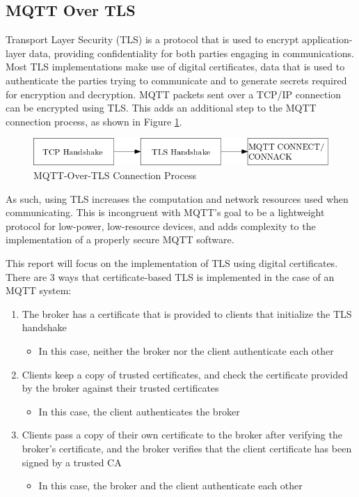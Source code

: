 \documentclass[12pt]{article}
\begin{document}
\subsection{MQTT Over TLS}
Transport Layer Security (TLS) is a protocol that is used to encrypt application-layer data, providing confidentiality for both parties engaging in communications. Most TLS implementations make use of digital certificates, data that is used to authenticate the parties trying to communicate and to generate secrets required for encryption and decryption. MQTT packets sent over a TCP/IP connection can be encrypted using TLS. This adds an additional step to the MQTT connection process, as shown in Figure \ref{fig:connection}.\par
\begin{figure}[!htb]
\centering
	\includegraphics[scale=0.5]{tcp-tls-mqtt.png}
	\caption{MQTT-Over-TLS Connection Process\label{fig:connection}}
\end{figure}
As such, using TLS increases the computation and network resources used when communicating. This is incongruent with MQTT's goal to be a lightweight protocol for low-power, low-resource devices, and adds complexity to the implementation of a properly secure MQTT software.\par
This report will focus on the implementation of TLS using digital certificates. There are 3 ways that certificate-based TLS is implemented in the case of an MQTT system:
\begin{enumerate}
	\item The broker has a certificate that is provided to clients that initialize the TLS handshake
	\begin{itemize}
		\item In this case, neither the broker nor the client authenticate each other
	\end{itemize}
	\item Clients keep a copy of trusted certificates, and check the certificate provided by the broker against their trusted certificates
	\begin{itemize}
		\item In this case, the client authenticates the broker
	\end{itemize}
	\item Clients pass a copy of their own certificate to the broker after verifying the broker's certificate, and the broker verifies that the client certificate has been signed by a trusted CA
	\begin{itemize}
		\item In this case, the broker and the client authenticate each other
	\end{itemize}
\end{enumerate}
\end{document}
